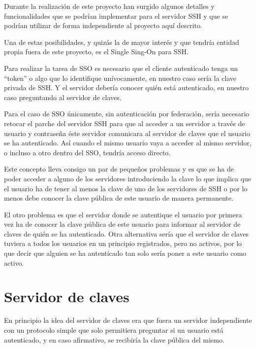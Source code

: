         Durante la realización de este proyecto han surgido algunos
        detalles y funcionalidades que se podrían implementar para el
        servidor SSH y que se podrían utilizar de forma independiente al
        proyecto aquí descrito.

        Una de estas posibilidades, y quizás la de mayor interés y que
        tendría entidad propia fuera de este proyecto, es el Single Sing-On
        para SSH.

        Para realizar la tarea de SSO es necesario que el cliente
        autenticado tenga un ``token'' o algo que lo identifique
        unívocamente, en nuestro caso sería la clave privada de SSH. Y el
        servidor debería conocer quién está autenticado, en nuestro caso
        preguntando al servidor de claves.

        Para el caso de SSO únicamente, sin autenticación por federación,
        sería necesario retocar el parche del servidor SSH para que al
        acceder a un servidor a través de usuario y contraseña éste
        servidor comunicara al servidor de claves que el usuario se ha
        autenticado. Así cuando el mismo usuario vaya a acceder al mismo
        servidor, o incluso a otro dentro del SSO, tendría acceso directo.

        Este concepto lleva consigo un par de pequeños problemas y es que
        se ha de poder acceder a alguno de los servidores introduciendo la
        clave lo que implica que el usuario ha de tener al menos la clave
        de uno de los servidores de SSH o por lo menos debe conocer la
        clave pública de este usuario de manera permanente.

        El otro problema es que el servidor donde se autentique el usuario
        por primera vez ha de conocer la clave pública de este usuario
        para informar al servidor de claves de quién se ha autenticado.
        Otra alternativa sería que el servidor de claves tuviera a todos
        los usuarios en un principio registrados, pero no activos, por lo
        que decir que alguien se ha autenticado tan solo sería poner a este
        usuario como activo.
    
    \section{Servidor de claves}

    En principio la idea del servidor de claves era que fuera un servidor
    independiente con un protocolo simple que solo permitiera preguntar
    si un usuario está autenticado, y en caso afirmativo, se recibiría la
    clave pública del mismo.

